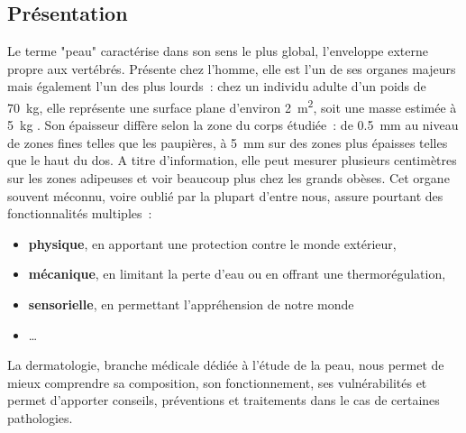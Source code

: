 \subsection{Présentation}
Le terme "peau" caractérise dans son sens le plus global, l’enveloppe externe propre aux vertébrés. Présente chez l’homme, elle est l’un de ses organes majeurs mais également l’un des plus lourds~: chez un individu adulte d’un poids de \SI{70}{\kilo\gram}, elle représente une surface plane d’environ \SI{2}{\metre\squared}, soit une masse estimée à \SI{5}{\kilo\gram} \cite{McGrath2010}. Son épaisseur diffère selon la zone du corps étudiée~: de \SI{0,5}{\milli\metre} au niveau de zones fines telles que les paupières, à \SI{5}{\milli\metre} sur des zones plus épaisses telles que le haut du dos. A titre d'information, elle peut mesurer plusieurs centimètres sur les zones adipeuses et voir beaucoup plus chez les grands obèses. Cet organe souvent méconnu, voire oublié par la plupart d’entre nous, assure pourtant des fonctionnalités multiples~: 
\begin{itemize}
\item \textbf{physique}, en apportant une protection contre le monde extérieur,
\item \textbf{mécanique}, en limitant la perte d’eau ou en offrant une thermorégulation,
\item \textbf{sensorielle}, en permettant l'appréhension de notre monde
\item \ldots
\end{itemize}\par

La dermatologie, branche médicale dédiée à l’étude de la peau, nous permet de mieux comprendre sa composition, son fonctionnement, ses vulnérabilités et permet d’apporter conseils, préventions et traitements dans le cas de certaines pathologies.\par

